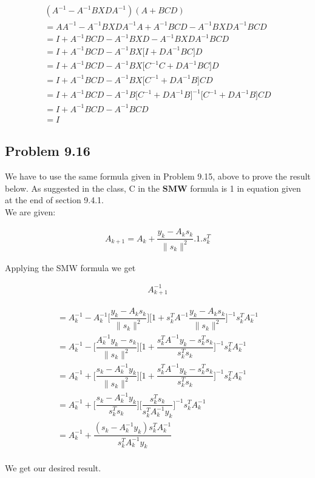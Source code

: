 \documentclass[letterpaper,12pt]{article}
\theoremstyle{definition}
\begin{document}
\begin{align*}
(A^{-1} - A^{-1}BXDA^{-1})(A+BCD) \\
= AA^{-1} - A^{-1}BXDA^{-1}A + A^{-1}BCD - A^{-1}BXDA^{-1}BCD \\
= I +  A^{-1}BCD - A^{-1}BXD -A^{-1}BXDA^{-1}BCD  \\
= I +  A^{-1}BCD - A^{-1}BX\big[I + DA^{-1}BC\big]D \\
= I +  A^{-1}BCD - A^{-1}BX\big[C^{-1}C + DA^{-1}BC\big]D\\
= I +  A^{-1}BCD - A^{-1}BX\big[C^{-1} + DA^{-1}B\big]CD \\
= I +  A^{-1}BCD - A^{-1}B\big[C^{-1} + DA^{-1}B\big]^{-1}\big[C^{-1} + DA^{-1}B\big]CD\\
= I + A^{-1}BCD - A^{-1}BCD\\
= I
\end{align*}

\subsection*{Problem 9.16}
\begin{flushleft}
We have to use the same formula given in Problem 9.15, above to prove the result below. As suggested in the class, C in the $\textbf{SMW}$ formula is 1 in equation given at the end of section 9.4.1.
\\
\vspace{2mm}
We are given:
\end{flushleft}

\begin{align*}
    A_{k+1} = A_{k} + \dfrac{y_k - A_{k}s_{k}}{\lVert s_k \rVert^2}.1.s_{k}^T 
\end{align*}

\begin{flushleft}
Applying the SMW formula we get
\end{flushleft}
\begin{align*}
  A_{k+1}^{-1}   
\end{align*}

\begin{align*}
 = A_{k}^{-1} -A_{k}^{-1}\bigg[ \dfrac{y_k - A_{k}s_{k}}{\lVert s_k \rVert^2}\bigg]\bigg[1 + s_{k}^TA^{-1} \dfrac{y_k - A_{k}s_{k}}{\lVert s_k \rVert^2} \bigg]^{-1}s_{k}^TA_k^{-1}\\
 = A_{k}^{-1} -\bigg[ \dfrac{A_{k}^{-1}y_k - s_{k}}{\lVert s_k \rVert^2}\bigg]\bigg[1 + \dfrac{s_{k}^TA^{-1} y_k - s_{k}^Ts_{k}}{s_{k}^Ts_{k}} \bigg]^{-1}s_{k}^TA_k^{-1}\\
  = A_{k}^{-1} +\bigg[ \dfrac{s_{k}-A_{k}^{-1}y_k}{\lVert s_k \rVert^2}\bigg]\bigg[1 + \dfrac{s_{k}^TA^{-1} y_k - s_{k}^Ts_{k}}{s_{k}^Ts_{k}} \bigg]^{-1}s_{k}^TA_k^{-1}\\
    = A_{k}^{-1} +\bigg[ \dfrac{s_{k}-A_{k}^{-1}y_k}{s_{k}^Ts_{k}}\bigg]\bigg[\dfrac{s_{k}^Ts_{k}}{s_{k}^TA_k^{-1} y_k} \bigg]^{-1}s_{k}^TA_k^{-1}\\
     = A_{k}^{-1} + \dfrac{(s_{k}-A_{k}^{-1}y_k)s_{k}^TA_k^{-1}}{s_{k}^TA_k^{-1} y_k} \\
\end{align*}
\begin{flushleft}
We get our desired result.
\end{flushleft}
\end{document}

